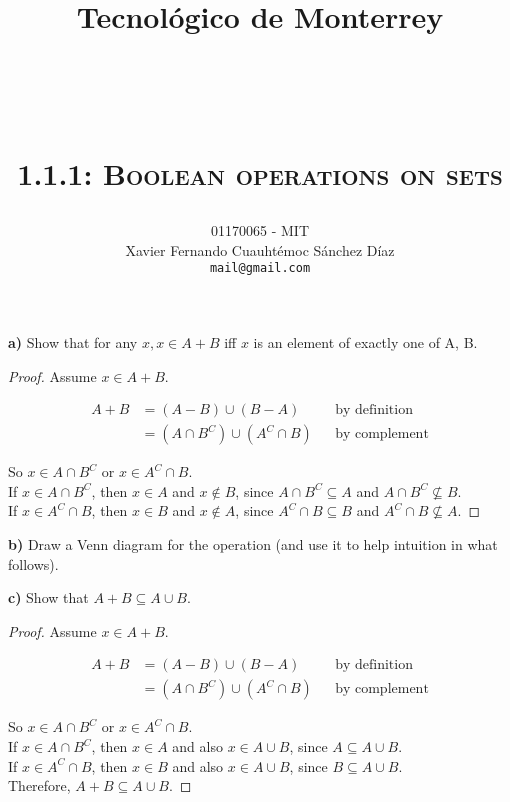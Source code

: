 \documentclass[titlepage, letterpaper, fleqn]{article}
\title{
\vspace{1in}
\textbf{Tecnológico de Monterrey} \\
\vspace{0.5in}
\textmd{\mahclass} \\
\large{\textit{\mahteacher}} \\
\vspace{0.5in}
\textsc{\mahtitle}\\
\textsc{1.1.1: Boolean operations on sets}\\
\author{01170065  - MIT \\
Xavier Fernando Cuauhtémoc Sánchez Díaz \\
\texttt{mail@gmail.com}}
\date{\mahdate}
}
\newcommand{\spacepls}{\vspace{5mm}}
\def\firstcircle{(0,0) circle (1.5cm)}
\def\secondcircle{(0:2cm) circle (1.5cm)}
\begin{document}
\begin{titlepage}
\maketitle
\end{titlepage}

%
%

{\large \textbf{a)} Show that for any \(x, x \in A + B\) iff \(x\) is an element of exactly one of A, B.}

\begin{proof}
  Assume \(x \in A + B\).

  \begin{align*}
  A + B &= (A-B) \cup (B-A)     &&\text{by definition}
  \\ &= (A \cap B^C) \cup (A^C \cap B)  &&\text{by complement}
  \end{align*}

  So \(x \in A \cap B^C\) or \(x \in A^C \cap B\). \\
  If \(x \in A \cap B^C\), then \(x \in A\) and \(x \not \in B\), since \(A \cap B^C \subseteq A\) and \(A \cap B^C \not \subseteq B\). \\
  If \(x \in A^C \cap B\), then \(x \in B\) and \(x \not \in A\), since \(A^C \cap B \subseteq B\) and \(A^C \cap B \not \subseteq A\).
\end{proof}

\spacepls

{\large \textbf{b)} Draw a Venn diagram for the operation (and use it to help intuition in what follows).}

\spacepls


\spacepls

{\large \textbf{c)} Show that \(A + B \subseteq A \cup B\).}

\begin{proof}
	Assume \(x \in A + B\).

  \begin{align*}
  A + B &= (A-B) \cup (B-A)     &&\text{by definition}
  \\ &= (A \cap B^C) \cup (A^C \cap B)  &&\text{by complement}
  \end{align*}

  So \(x \in A \cap B^C\) or \(x \in A^C \cap B\). \\
  If \(x \in A \cap B^C\), then \(x \in A\) and also \(x \in A \cup B\), since \(A \subseteq A \cup B\). \\
  If \(x \in A^C \cap B\), then \(x \in B\) and also \(x \in A \cup B\), since \(B \subseteq A \cup B\). \\
  Therefore, \(A + B \subseteq A \cup B\).
\end{proof}
\end{document}
